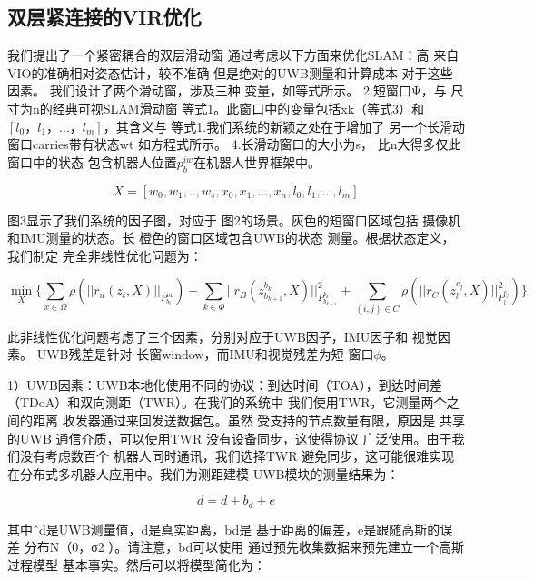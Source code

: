 \begin{translation}
\subsection{双层紧连接的VIR优化}

我们提出了一个紧密耦合的双层滑动窗 通过考虑以下方面来优化SLAM：高 来自VIO的准确相对姿态估计，较不准确
但是绝对的UWB测量和计算成本 对于这些因素。 我们设计了两个滑动窗，涉及三种 变量，如等式所示。 2.短窗口Ψ，与
尺寸为n的经典可视SLAM滑动窗 等式1。此窗口中的变量包括xk（等式3）和 $[l_0，l_1，... ，l_m]$，其含义与
等式1.我们系统的新颖之处在于增加了 另一个长滑动窗口carries带有状态wt 如方程式所示。 4.长滑动窗口的大小为s，
比n大得多仅此窗口中的状态 包含机器人位置$p_b^{iw}$在机器人世界框架中。

\begin{equation}
    X = [w_0, w_1, .. , w_s, x_0, x_1, ..., x_n, l_0, l_1, ... , l_m]
\end{equation}


图3显示了我们系统的因子图，对应于 图2的场景。灰色的短窗口区域包括 摄像机和IMU测量的状态。长
橙色的窗口区域包含UWB的状态 测量。根据状态定义，我们制定 完全非线性优化问题为：

\begin{equation}
  \min\limits_{X} \{ \sum\limits_{x \in \Omega} \rho(||r_u(z_t, X)||_{P_{b_t}^{iw}}) +
    \sum\limits_{k \in \Phi} ||r_B(z_{b_{k+1}}^{b_k}, X)||^2_{P_{b_{k+1}}^{b_k}} +
    \sum\limits_{(i,j) \in C} \rho (||r_C(z_l^{c_j}, X)||^2_{P_l^{c_j}})
  \}
\end{equation}

此非线性优化问题考虑了三个因素，分别对应于UWB因子，IMU因子和 视觉因素。 UWB残差是针对
长窗window，而IMU和视觉残差为短 窗口$\phi$。

1）UWB因素：UWB本地化使用不同的协议：到达时间（TOA），到达时间差 （TDoA）和双向测距（TWR）。在我们的系统中
我们使用TWR，它测量两个之间的距离 收发器通过来回发送数据包。虽然 受支持的节点数量有限，原因是 共享的UWB
通信介质，可以使用TWR 没有设备同步，这使得协议 广泛使用。由于我们没有考虑数百个 机器人同时通讯，我们选择TWR
避免同步，这可能很难实现 在分布式多机器人应用中。我们为测距建模 UWB模块的测量结果为：

\begin{equation}
    d = d + b_d + e
\end{equation}


其中ˆd是UWB测量值，d是真实距离，bd是 基于距离的偏差，e是跟随高斯的误差 分布N（0，σ2
）。请注意，bd可以使用 通过预先收集数据来预先建立一个高斯过程模型 基本事实。然后可以将模型简化为：


\end{translation}
